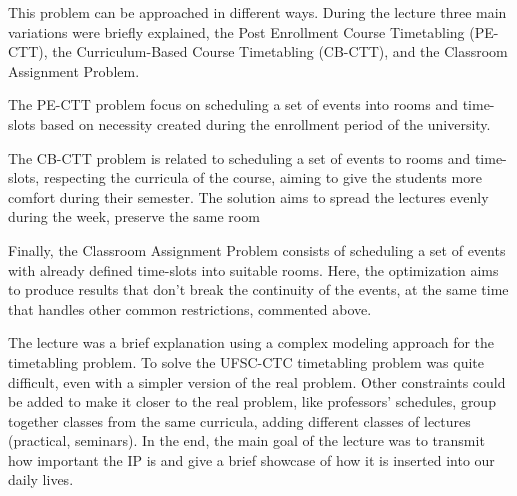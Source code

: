 \documentclass[a4paper,11pt]{article}
\begin{document}
This problem can be approached in different ways. During the lecture three main variations were briefly explained, the Post Enrollment Course Timetabling (PE-CTT), the Curriculum-Based Course Timetabling (CB-CTT), and the Classroom Assignment Problem.

The PE-CTT problem focus on scheduling a set of events into rooms and time-slots based on necessity created during the enrollment period of the university.

The CB-CTT problem is related to scheduling a set of events to rooms and time-slots, respecting the curricula of the course, aiming to give the students more comfort during their semester. The solution aims to spread the lectures evenly during the week, preserve the same room

Finally, the  Classroom Assignment Problem consists of scheduling a set of events with already defined time-slots into suitable rooms. Here, the optimization aims to produce results that don't break the continuity of the events, at the same time that handles other common restrictions, commented above.


\newpage


\FloatBarrier
\newpage


\FloatBarrier
\newpage


\FloatBarrier
\newpage


The lecture was a brief explanation using a complex modeling approach for the timetabling problem. To solve the UFSC-CTC timetabling problem was quite difficult, even with a simpler version of the real problem. Other constraints could be added to make it closer to the real problem, like professors' schedules, group together classes from the same curricula, adding different classes of lectures (practical, seminars). In the end, the main goal of the lecture was to transmit how important the IP is and give a brief showcase of how it is inserted into our daily lives.
\newpage
\end{document}

